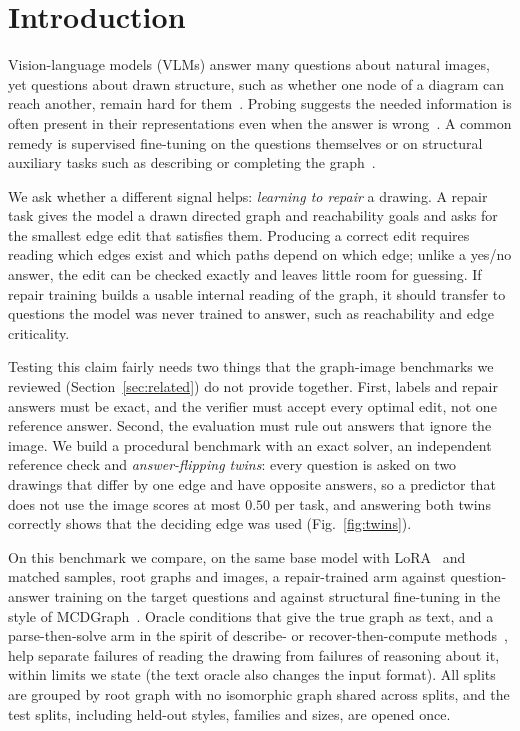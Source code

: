\section{Introduction}
\label{sec:intro}

Vision-language models (VLMs) answer many questions about natural images, yet questions
about drawn structure, such as whether one node of a diagram can reach another, remain hard
for them~\cite{mcdgraph,graphverse}. Probing suggests the needed information is often
present in their representations even when the answer is wrong~\cite{signals}. A common
remedy is supervised fine-tuning on the questions themselves or on structural auxiliary
tasks such as describing or completing the graph~\cite{mcdgraph}.

We ask whether a different signal helps: \emph{learning to repair} a drawing. A repair task
gives the model a drawn directed graph and reachability goals and asks for the smallest
edge edit that satisfies them. Producing a correct edit requires reading which edges exist
and which paths depend on which edge; unlike a yes/no answer, the edit can be checked
exactly and leaves little room for guessing. If repair training builds a usable internal
reading of the graph, it should transfer to questions the model was never trained to
answer, such as reachability and edge criticality.

Testing this claim fairly needs two things that the graph-image benchmarks we reviewed
(Section~\ref{sec:related}) do not provide together. First, labels and repair answers must be exact, and the verifier must
accept every optimal edit, not one reference answer. Second, the evaluation must rule out
answers that ignore the image. We build a procedural benchmark with an exact solver, an
independent reference check and \emph{answer-flipping twins}: every question is asked on
two drawings that differ by one edge and have opposite answers, so a predictor that does
not use the image scores at most $0.50$ per task, and answering both twins correctly shows
that the deciding edge was used (Fig.~\ref{fig:twins}).

On this benchmark we compare, on the same base model with LoRA~\cite{lora} and matched
samples, root graphs and images, a repair-trained arm against question-answer training on
the target questions and against structural fine-tuning in the style of
MCDGraph~\cite{mcdgraph}. Oracle conditions that give the true graph as text, and a
parse-then-solve arm in the spirit of describe- or recover-then-compute
methods~\cite{visiongraph,vgcompiler}, help separate failures of reading the drawing from failures of
reasoning about it, within limits we state (the text oracle also changes the input format). All splits are grouped by root graph with no isomorphic graph shared across
splits, and the test splits, including held-out styles, families and sizes, are opened once.

